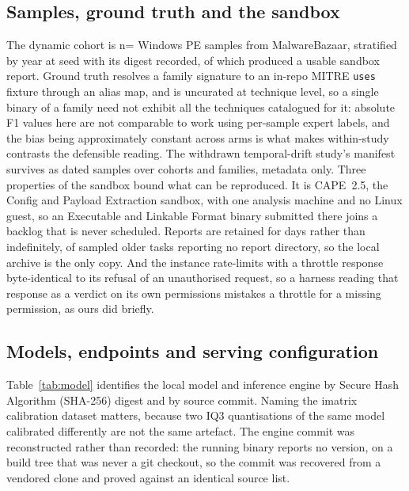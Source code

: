 \subsection{Samples, ground truth and the sandbox}\label{samples-ground-truth-and-the-sandbox}

The dynamic cohort is n= Windows PE samples from MalwareBazaar, stratified by year at
seed  with its digest recorded, of which  produced a usable
sandbox report. Ground truth resolves a family signature to an in-repo MITRE \texttt{uses} fixture
through an alias map, and is uncurated at technique level, so a single binary of a family need not
exhibit all the techniques catalogued for it: absolute F1 values here are not comparable to work
using per-sample expert labels, and the bias being approximately constant across arms is what makes
within-study contrasts the defensible reading. The withdrawn temporal-drift study's manifest
survives as  dated samples over  cohorts and 
families, metadata only. Three properties of the sandbox bound what can be reproduced. It is
CAPE~2.5, the Config and Payload Extraction sandbox, with one analysis machine and no Linux guest,
so an Executable and Linkable Format binary submitted there joins a backlog that is never scheduled.
Reports are retained for days rather than indefinitely,  of
 sampled older tasks reporting no report directory, so the local
archive is the only copy. And the instance rate-limits with a throttle response byte-identical to
its refusal of an unauthorised request, so a harness reading that response as a verdict on its own
permissions mistakes a throttle for a missing permission, as ours did briefly.

\subsection{Models, endpoints and serving configuration}\label{models-endpoints-and-serving-configuration}

Table~\ref{tab:model} identifies the local model and inference engine by Secure Hash Algorithm
(SHA-256) digest and by source commit. Naming the imatrix calibration dataset
matters, because two IQ3 quantisations of the same model calibrated differently are not the same
artefact. The engine commit was reconstructed rather than recorded: the running binary reports no
version, on a build tree that was never a git checkout, so the commit was recovered from a vendored
clone and proved against an identical source list.


